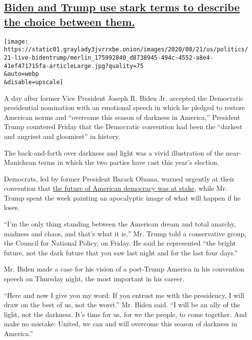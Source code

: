\hypertarget{biden-and-trump-use-stark-terms-to-describe-the-choice-between-them}{%
\subsection{\texorpdfstring{\protect\hyperlink{biden-and-trump-use-stark-terms-to-describe-the-choice-between-them}{Biden
and Trump use stark terms to describe the choice between
them.}}{Biden and Trump use stark terms to describe the choice between them.}}\label{biden-and-trump-use-stark-terms-to-describe-the-choice-between-them}}

\texttt{[image: https://static01.graylady3jvrrxbe.onion/images/2020/08/21/us/politics/21-live-bidentrump/merlin\_175992840\_d8738945-494c-4552-a8e4-41ef471715fa-articleLarge.jpg?quality=75\\\&auto=webp\\\&disable=upscale]}

A day after former Vice President Joseph R. Biden Jr. accepted the
Democratic presidential nomination with an emotional speech in which he
pledged to restore American norms and ``overcome this season of darkness
in America,'' President Trump countered Friday that the Democratic
convention had been the ``darkest and angriest and gloomiest'' in
history.

The back-and-forth over darkness and light was a vivid illustration of
the near-Manichean terms in which the two parties have cast this year's
election.

Democrats, led by former President Barack Obama, warned urgently at
their convention that
\href{https://www.nytimes3xbfgragh.onion/2020/08/20/us/politics/obama-trump-democratic-convention.html}{the
future of American democracy was at stake}, while Mr. Trump spent the
week painting an apocalyptic image of what will happen if he loses.

``I'm the only thing standing between the American dream and total
anarchy, madness and chaos, and that's what it is,'' Mr. Trump told a
conservative group, the Council for National Policy, on Friday. He said
he represented ``the bright future, not the dark future that you saw
last night and for the last four days.''

Mr. Biden made a case for his vision of a post-Trump America in his
convention speech on Thursday night, the most important in his career.

``Here and now I give you my word: If you entrust me with the
presidency, I will draw on the best of us, not the worst.'' Mr. Biden
said. ``I will be an ally of the light, not the darkness. It's time for
us, for we the people, to come together. And make no mistake: United, we
can and will overcome this season of darkness in America.''

